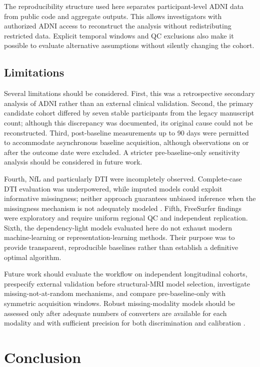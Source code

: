 \documentclass[preprint,12pt]{elsarticle}
\begin{document}
The reproducibility structure used here separates participant-level ADNI data from public code and aggregate outputs. This allows investigators with authorized ADNI access to reconstruct the analysis without redistributing restricted data. Explicit temporal windows and QC exclusions also make it possible to evaluate alternative assumptions without silently changing the cohort.

\subsection{Limitations}

Several limitations should be considered. First, this was a retrospective secondary analysis of ADNI rather than an external clinical validation. Second, the primary candidate cohort differed by seven stable participants from the legacy manuscript count; although this discrepancy was documented, its original cause could not be reconstructed. Third, post-baseline measurements up to 90 days were permitted to accommodate asynchronous baseline acquisition, although observations on or after the outcome date were excluded. A stricter pre-baseline-only sensitivity analysis should be considered in future work.

Fourth, NfL and particularly DTI were incompletely observed. Complete-case DTI evaluation was underpowered, while imputed models could exploit informative missingness; neither approach guarantees unbiased inference when the missingness mechanism is not adequately modeled \cite{Little2019,Janssen2010,austinMissingDataClinical2021}. Fifth, FreeSurfer findings were exploratory and require uniform regional QC and independent replication. Sixth, the dependency-light models evaluated here do not exhaust modern machine-learning or representation-learning methods. Their purpose was to provide transparent, reproducible baselines rather than establish a definitive optimal algorithm.

Future work should evaluate the workflow on independent longitudinal cohorts, prespecify external validation before structural-MRI model selection, investigate missing-not-at-random mechanisms, and compare pre-baseline-only with symmetric acquisition windows. Robust missing-modality models should be assessed only after adequate numbers of converters are available for each modality and with sufficient precision for both discrimination and calibration \cite{rileyMinimumSampleSizeExternal2021}.

\section{Conclusion}
\end{document}
